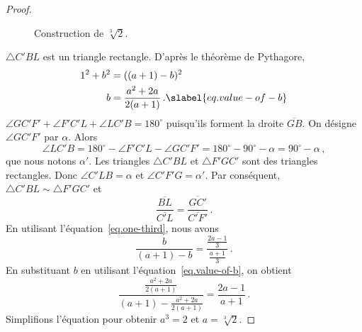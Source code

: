 \begin{proof}
\begin{figure}[htbp]

\vspace{-2ex}
\caption{Construction de $\sqrt[3]{2}$.}\label{f.messer3}
\end{figure}

$\triangle C'BL$ est un triangle rectangle. D'après le théorème de Pythagore,
\begin{subequations}
\begin{align}
1^2 + b^2 &= ((a+1)-b)^2\\
b&=\frac{a^2+2a}{2(a+1)}\,.\slabel{eq.value-of-b}
\end{align}
\end{subequations}
$\angle GC'F' + \angle F'C'L + \angle LC'B = 180^\circ$ puisqu'ils forment la droite $\overline{GB}$. On désigne $\angle GC'F'$ par $\alpha$. Alors 
\[
\angle LC'B=180^\circ - \angle F'C'L - \angle GC'F'= 180^\circ - 90^\circ - \alpha = 90^\circ -\alpha\,,
\]
que nous notons $\alpha'$. Les triangles $\triangle C'BL$ et  $\triangle F'GC'$ sont des triangles rectangles. Donc $\angle C'LB=\alpha$ et $\angle C'F'G=\alpha'$. Par conséquent, $\triangle C'BL\sim\triangle F'GC'$ et 
\[
\frac{\overline{BL}}{\overline{C'L}}=\frac{\overline{GC'}}{\overline{C'F'}}\,.
\]
En utilisant l'équation~\ref{eq.one-third}, nous avons 
\[
\frac{b}{(a+1)-b}=\frac{\displaystyle\frac{2a-1}{3}}{\displaystyle\frac{a+1}{3}}\,.
\]
En substituant $b$ en utilisant l'équation~\ref{eq.value-of-b}, on obtient 
\[
\displaystyle\frac{\displaystyle\frac{a^2+2a}{2(a+1)}}{(a+1)-\displaystyle\frac{a^2+2a}{2(a+1)}}=\frac{2a-1}{a+1}\,.
\]
Simplifions l'équation pour obtenir $a^3=2$ et $a=\sqrt[3]{2}$.
\end{proof}

